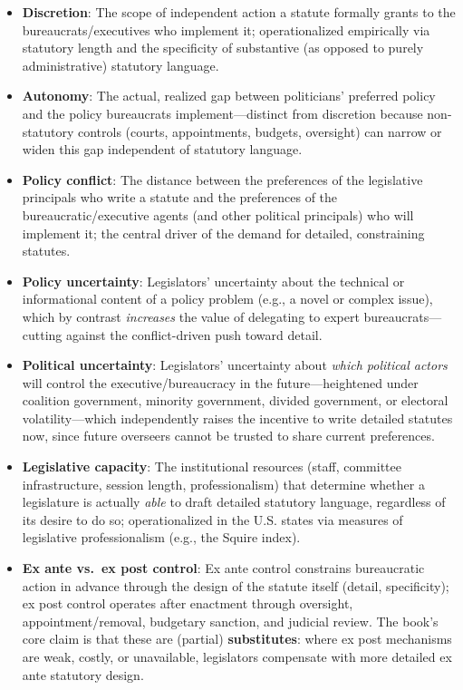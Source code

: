 \documentclass[12pt]{article}
\begin{document}
\begin{itemize}[leftmargin=*, itemsep=4pt]
    \item \textbf{Discretion}: The scope of independent action a statute formally grants to the bureaucrats/executives who implement it; operationalized empirically via statutory length and the specificity of substantive (as opposed to purely administrative) statutory language.
    \item \textbf{Autonomy}: The actual, realized gap between politicians' preferred policy and the policy bureaucrats implement---distinct from discretion because non-statutory controls (courts, appointments, budgets, oversight) can narrow or widen this gap independent of statutory language.
    \item \textbf{Policy conflict}: The distance between the preferences of the legislative principals who write a statute and the preferences of the bureaucratic/executive agents (and other political principals) who will implement it; the central driver of the demand for detailed, constraining statutes.
    \item \textbf{Policy uncertainty}: Legislators' uncertainty about the technical or informational content of a policy problem (e.g., a novel or complex issue), which by contrast \emph{increases} the value of delegating to expert bureaucrats---cutting against the conflict-driven push toward detail.
    \item \textbf{Political uncertainty}: Legislators' uncertainty about \emph{which political actors} will control the executive/bureaucracy in the future---heightened under coalition government, minority government, divided government, or electoral volatility---which independently raises the incentive to write detailed statutes now, since future overseers cannot be trusted to share current preferences.
    \item \textbf{Legislative capacity}: The institutional resources (staff, committee infrastructure, session length, professionalism) that determine whether a legislature is actually \emph{able} to draft detailed statutory language, regardless of its desire to do so; operationalized in the U.S. states via measures of legislative professionalism (e.g., the Squire index).
    \item \textbf{Ex ante vs.\ ex post control}: Ex ante control constrains bureaucratic action in advance through the design of the statute itself (detail, specificity); ex post control operates after enactment through oversight, appointment/removal, budgetary sanction, and judicial review. The book's core claim is that these are (partial) \textbf{substitutes}: where ex post mechanisms are weak, costly, or unavailable, legislators compensate with more detailed ex ante statutory design.

\end{itemize}
\end{document}
